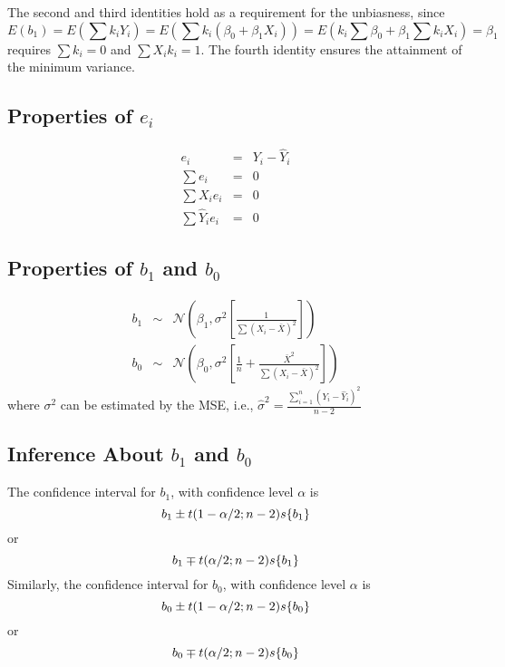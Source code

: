 \documentclass{article}
\newcommand{\NN}{\mathcal{N}}
\begin{document}
The second and third identities hold as a requirement for the unbiasness, since $$E(b_1) = E\left(\sum k_i Y_i\right)= E\left(\sum k_i (\beta_0+\beta_1 X_i)\right) = E\left(k_i \sum\beta_0 + \beta_1 \sum k_i X_i \right) = \beta_1$$ requires $\sum k_i = 0$  and $\sum X_i k_i = 1$.
The fourth identity ensures the attainment of the minimum variance.


\subsection{Properties of $e_i$}
\begin{eqnarray}
	e_i & = & Y_i - \hat Y_i \\
	\sum e_i & = & 0 \\
	\sum X_i e_i & = & 0 \\
	\sum \hat Y_i e_i & = & 0
\end{eqnarray}

\subsection{Properties of $b_1$ and $b_0$}
\begin{eqnarray}
	b_1 &\sim& \NN \left(\beta_1,\sigma^2 \left[\frac{1}{\sum(X_i-\bar X)^2}\right]\right) \\
	b_0 &\sim& \NN \left(\beta_0,\sigma^2 \left[\frac{1}{n} + \frac{{\bar X}^2}{\sum(X_i-\bar X)^2}\right] \right)
\end{eqnarray}
where $\sigma^2$ can be estimated by the MSE, i.e., $\hat \sigma^2 = \frac{\sum_{i=1}^n (Y_i - \hat Y_i)^2}{n-2}$

\subsection{Inference About $b_1$ and $b_0$}
The confidence interval for $b_1$, with confidence level $\alpha$ is
\begin{equation}
	b_1 \pm t(1-\alpha/2;n-2)s\{b_1\}\\
\end{equation}
or
\begin{equation}
	b_1 \mp t(\alpha/2;n-2)s\{b_1\}\\
\end{equation}
Similarly, the confidence interval for $b_0$, with confidence level $\alpha$ is
\begin{equation}
	b_0 \pm t(1-\alpha/2;n-2)s\{b_0\}\\
\end{equation}
or
\begin{equation}
	b_0 \mp t(\alpha/2;n-2)s\{b_0\}\\
\end{equation}
\end{document}
